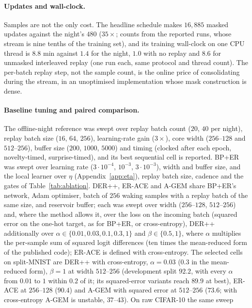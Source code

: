 \documentclass{article}
\begin{document}
\paragraph{Updates and wall-clock.} Samples are not the only cost. The headline schedule
makes $16{,}885$ masked updates against the night's $480$ ($35\times$; counts from the
reported runs, whose stream is nine tenths of the training set), and its training wall-clock
on one CPU thread is $8.8$ min against $1.4$ for the night, $1.0$ with no replay and $8.6$
for unmasked interleaved replay (one run each, same protocol and thread count). The
per-batch replay step, not the sample count, is the online price of consolidating during
the stream, in an unoptimised implementation whose mask construction is dense.
\paragraph{Baseline tuning and paired comparison.} The offline-night reference was swept over
replay batch count ($20$, $40$ per night), replay batch size ($16$, $64$, $256$), learning-rate
gain ($3\times$), core width ($256$--$128$ and $512$--$256$), buffer size ($200$, $1000$,
$5000$) and timing (clocked after each epoch, novelty-timed, surprise-timed), and its best
sequential cell is reported. BP+ER was swept over learning rate ($3{\cdot}10^{-4}$,
$10^{-3}$, $3{\cdot}10^{-3}$), width and buffer size, and the local learner over $\eta$
(Appendix~\ref{app:eta}), replay batch size, cadence and the gates of
Table~\ref{tab:ablation}. DER++, ER-ACE and A-GEM share BP+ER's network, Adam optimiser,
batch of $256$ waking samples with a replay batch of the same size, and reservoir buffer;
each was swept over width ($256$--$128$, $512$--$256$) and, where the method allows it, over
the loss on the incoming batch (squared error on the one-hot target, as for BP+ER, or
cross-entropy), DER++ additionally over $\alpha\in\{0.01,0.03,0.1,0.3,1\}$ and
$\beta\in\{0.5,1\}$, where $\alpha$ multiplies the per-sample sum of squared logit
differences (ten times the mean-reduced form of the published code); ER-ACE is defined with
cross-entropy. The selected cells on split-MNIST are DER++ with cross-entropy, $\alpha=0.03$
($0.3$ in the mean-reduced form), $\beta=1$ at width $512$--$256$ (development split $92.2$,
with every $\alpha$ from $0.01$ to $1$ within $0.2$ of it; its squared-error variants reach
$89.9$ at best), ER-ACE at $256$--$128$ ($90.4$) and A-GEM with squared error at $512$--$256$
($73.6$; with cross-entropy A-GEM is unstable, $37$--$43$). On raw CIFAR-10 the same sweep
\end{document}
